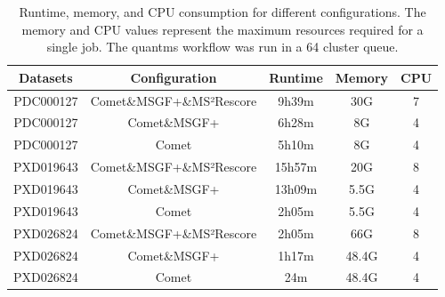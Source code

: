 \documentclass[12pt]{article}
\begin{document}
\begin{table}[h!]
\centering
\caption{Runtime, memory, and CPU consumption for different configurations. The memory and CPU values represent the maximum resources required for a single job. The quantms workflow was run in a 64 cluster queue.}
\begin{tabular}{|c|c|c|c|c|}
\hline
Datasets & Configuration & Runtime& Memory & CPU \\
\hline
PDC000127 & Comet\&MSGF+\&MS²Rescore & 9h39m & 30G & 7 \\
PDC000127 & Comet\&MSGF+ & 6h28m & 8G & 4 \\
PDC000127 & Comet & 5h10m & 8G & 4 \\
PXD019643 & Comet\&MSGF+\&MS²Rescore & 15h57m & 20G & 8 \\
PXD019643 & Comet\&MSGF+ & 13h09m & 5.5G & 4 \\
PXD019643 & Comet & 2h05m & 5.5G & 4 \\
PXD026824 & Comet\&MSGF+\&MS²Rescore & 2h05m & 66G & 8 \\
PXD026824 & Comet\&MSGF+ & 1h17m & 48.4G & 4 \\
PXD026824 & Comet & 24m & 48.4G & 4 \\
\hline
\end{tabular}
\label{tab:resources_stats}
\end{table}
\end{document}
